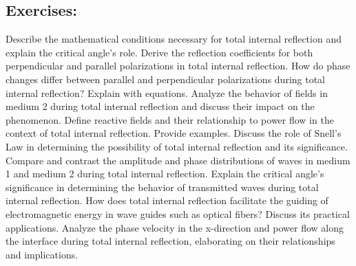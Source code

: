 \begin{mdframed}[ backgroundcolor=lightblue, linewidth=1pt, hidealllines=true]
\section{Exercises:}
\begin{ExerciseList}
\Exercise[label={ex321}]
Describe the mathematical conditions necessary for total internal reflection and explain the critical angle's role.
\Exercise[label={ex322}]
Derive the reflection coefficients for both perpendicular and parallel polarizations in total internal reflection.
\Exercise[label={ex323}]
How do phase changes differ between parallel and perpendicular polarizations during total internal reflection? Explain with equations.
\Exercise[label={ex324}]
Analyze the behavior of fields in medium 2 during total internal reflection and discuss their impact on the phenomenon.
\Exercise[label={ex325}]
Define reactive fields and their relationship to power flow in the context of total internal reflection. Provide examples.
\Exercise[label={ex326}]
Discuss the role of Snell's Law in determining the possibility of total internal reflection and its significance.
\Exercise[label={ex327}]
Compare and contrast the amplitude and phase distributions of waves in medium 1 and medium 2 during total internal reflection.
\Exercise[label={ex328}]
Explain the critical angle's significance in determining the behavior of transmitted waves during total internal reflection.
\Exercise[label={ex329}]
How does total internal reflection facilitate the guiding of electromagnetic energy in wave guides such as optical fibers? Discuss its practical applications.
\Exercise[label={ex3210}]
Analyze the phase velocity in the x-direction and power flow along the interface during total internal reflection, elaborating on their relationships and implications.
\end{ExerciseList}
\end{mdframed}
